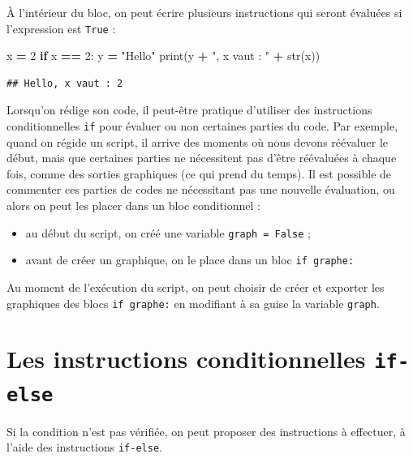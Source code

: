 \documentclass[12pt,]{book}
\newenvironment{Shaded}{\begin{snugshade}}{\end{snugshade}}
\newcommand{\DecValTok}[1]{\textcolor[rgb]{0.00,0.00,0.81}{#1}}
\newcommand{\StringTok}[1]{\textcolor[rgb]{0.31,0.60,0.02}{#1}}
\newcommand{\ControlFlowTok}[1]{\textcolor[rgb]{0.13,0.29,0.53}{\textbf{#1}}}
\newcommand{\OperatorTok}[1]{\textcolor[rgb]{0.81,0.36,0.00}{\textbf{#1}}}
\newcommand{\BuiltInTok}[1]{#1}
\newcommand{\NormalTok}[1]{#1}
\providecommand{\tightlist}{%
  \setlength{\itemsep}{0pt}\setlength{\parskip}{0pt}}
\numberwithin{equation}{section}
\numberwithin{countremarque}{section}
\let\BeginKnitrBlock\begin \let\EndKnitrBlock\end
\begin{document}
À l'intérieur du bloc, on peut écrire plusieurs instructions qui seront
évaluées si l'expression est \texttt{True} :

\begin{Shaded}
\begin{Highlighting}[]
\NormalTok{x }\OperatorTok{=} \DecValTok{2}
\ControlFlowTok{if}\NormalTok{ x }\OperatorTok{==} \DecValTok{2}\NormalTok{:}
\NormalTok{  y }\OperatorTok{=} \StringTok{"Hello"}
  \BuiltInTok{print}\NormalTok{(y }\OperatorTok{+} \StringTok{", x vaut : "} \OperatorTok{+} \BuiltInTok{str}\NormalTok{(x))}
\end{Highlighting}
\end{Shaded}

\begin{lstlisting}
## Hello, x vaut : 2
\end{lstlisting}

\BeginKnitrBlock{remarque}
Lorsqu'on rédige son code, il peut-être pratique d'utiliser des
instructions conditionnelles \texttt{if} pour évaluer ou non certaines
parties du code. Par exemple, quand on régide un script, il arrive des
moments où nous devons réévaluer le début, mais que certaines parties ne
nécessitent pas d'être réévaluées à chaque fois, comme des sorties
graphiques (ce qui prend du temps). Il est possible de commenter ces
parties de codes ne nécessitant pas une nouvelle évaluation, ou alors on
peut les placer dans un bloc conditionnel :

\begin{itemize}
\tightlist
\item
  au début du script, on créé une variable \texttt{graph\ =\ False} ;
\item
  avant de créer un graphique, on le place dans un bloc
  \texttt{if\ graphe:}
\end{itemize}

Au moment de l'exécution du script, on peut choisir de créer et exporter
les graphiques des blocs \texttt{if\ graphe:} en modifiant à sa guise la
variable \texttt{graph}.
\EndKnitrBlock{remarque}

\section{\texorpdfstring{Les instructions conditionnelles
\texttt{if-else}}{Les instructions conditionnelles if-else}}\label{les-instructions-conditionnelles-if-else}

Si la condition n'est pas vérifiée, on peut proposer des instructions à
effectuer, à l'aide des instructions \texttt{if-else}.
\end{document}
